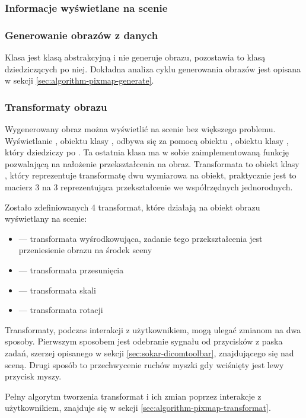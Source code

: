 \subsubsection{Informacje wyświetlane na scenie}


\subsubsection{Generowanie obrazów z danych}

Klasa  jest klasą abstrakcyjną i nie generuje obrazu, pozostawia to klasą dziedziczących po niej.
Dokładna analiza cyklu generowania obrazów jest opisana w sekcji \ref{sec:algorithm-pixmap-generate}.

\subsubsection{Transformaty obrazu}

\par
Wygenerowany obraz można wyświetlić na scenie bez większego problemu.
Wyświetlanie , obiektu klasy , odbywa się za pomocą obiektu , obiektu klasy , który dziedziczy po .
Ta ostatnia klasa ma w sobie zaimplementowaną funkcję pozwalającą na nałożenie przekształcenia na obraz.
Transformata to obiekt klasy , który reprezentuje transformatę dwu wymiarowa na obiekt, praktycznie jest to macierz 3 na 3 reprezentująca przekształcenie we współrzędnych jednorodnych.

Zostało zdefiniowanych 4 transformat, które działają na obiekt obrazu wyświetlany na scenie:
\begin{itemize}
    \item {} --- transformata wyśrodkowująca, zadanie tego przekształcenia jest przeniesienie obrazu na środek sceny
    \item {} --- transformata przesunięcia
    \item {} --- transformata skali
    \item {} --- transformata rotacji
\end{itemize}

\par
Transformaty, podczas interakcji z użytkownikiem, mogą ulegać zmianom na dwa sposoby.
Pierwszym sposobem jest odebranie sygnału od przycisków z paska zadań, szerzej opisanego w sekcji \ref{sec:sokar-dicomtoolbar}, znajdującego się nad sceną.
Drugi sposób to przechwycenie ruchów myszki gdy wciśnięty jest lewy przycisk myszy.
\par
Pełny algorytm tworzenia transformat i ich zmian poprzez interakcje z użytkownikiem, znajduje się w sekcji \ref{sec:algorithm-pixmap-transformat}.